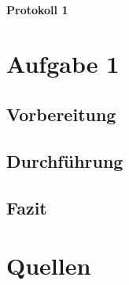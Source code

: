 \newpage

\paragraph{\LARGE Protokoll 1}

\section{Aufgabe 1}
	\subsection{Vorbereitung}
	
	\subsection{Durchführung}
	
	\subsection{Fazit}
	
\section{Quellen}
